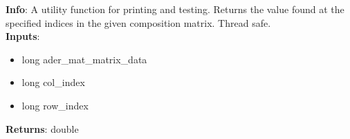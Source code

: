\textbf{Info}: A utility function for printing and testing. Returns the value
found at the specified indices in the given composition matrix. Thread safe.\\

\noindent \textbf{Inputs}:
\begin{itemize}
\item{long ader\_mat\_matrix\_data}
\item{long col\_index}
\item{long row\_index}
\end{itemize}

\noindent \textbf{Returns}: double
